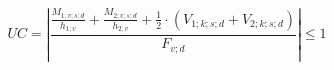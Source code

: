 \documentclass[12pt]{article}
\begin{document}
\begin{displaymath}
UC = \left| \frac {\frac {M_{1;v;s;d}} {h_{1;v}} + \frac {M_{2;v;s;d}} {h_{2;v}} + \frac {1} {2} \cdot \left( V_{1;k;s;d} + V_{2;k;s;d} \right)} {F_{v;d}} \right| \leq 1
\end{displaymath}
\end{document}
